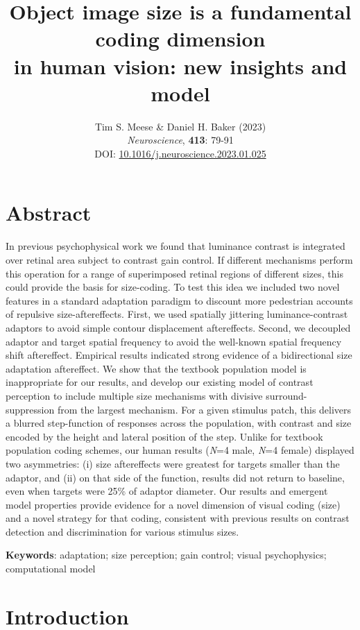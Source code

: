 \documentclass[
]{article}
\title{Object image size is a fundamental coding dimension\\
in human vision: new insights and model}
\author{Tim S. Meese \& Daniel H. Baker (2023)\\
\emph{Neuroscience}, \textbf{413}: 79-91\\
DOI: \href{https://dx.doi.org/10.1016/j.neuroscience.2023.01.025}{10.1016/j.neuroscience.2023.01.025}}
\date{}
\begin{document}
\maketitle


\hypertarget{abstract}{%
\section*{Abstract}\label{abstract}}

In previous psychophysical work we found that luminance contrast is integrated over retinal area subject to contrast gain control. If different mechanisms perform this operation for a range of superimposed retinal regions of different sizes, this could provide the basis for size-coding. To test this idea we included two novel features in a standard adaptation paradigm to discount more pedestrian accounts of repulsive size-aftereffects. First, we used spatially jittering luminance-contrast adaptors to avoid simple contour displacement aftereffects. Second, we decoupled adaptor and target spatial frequency to avoid the well-known spatial frequency shift aftereffect. Empirical results indicated strong evidence of a bidirectional size adaptation aftereffect. We show that the textbook population model is inappropriate for our results, and develop our existing model of contrast perception to include multiple size mechanisms with divisive surround-suppression from the largest mechanism. For a given stimulus patch, this delivers a blurred step-function of responses across the population, with contrast and size encoded by the height and lateral position of the step. Unlike for textbook population coding schemes, our human results (\emph{N}=4 male, \emph{N}=4 female) displayed two asymmetries: (i) size aftereffects were greatest for targets smaller than the adaptor, and (ii) on that side of the function, results did not return to baseline, even when targets were 25\% of adaptor diameter. Our results and emergent model properties provide evidence for a novel dimension of visual coding (size) and a novel strategy for that coding, consistent with previous results on contrast detection and discrimination for various stimulus sizes.

\textbf{Keywords}: adaptation; size perception; gain control; visual psychophysics; computational model

\hypertarget{introduction}{%
\section*{Introduction}\label{introduction}}
\end{document}
